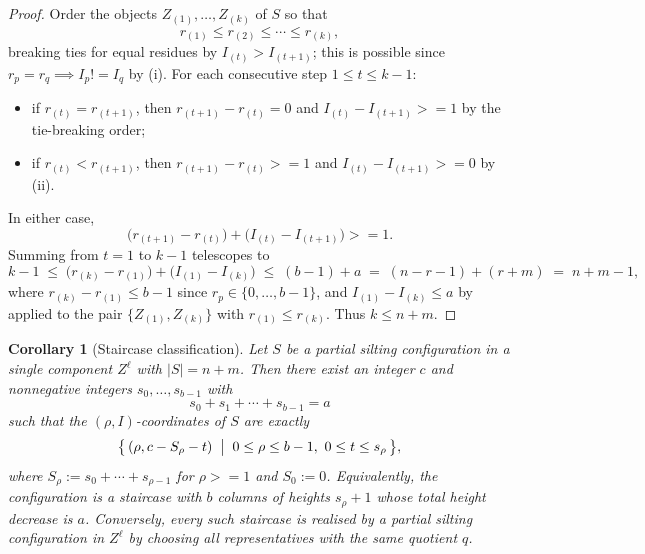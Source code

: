 \documentclass[11pt, a4paper]{article}
\newtheorem{corollary}[theorem]{Corollary}
\theoremstyle{definition}
\def\ge{>=}%
\def\neq{!=}%
\def\mathcal#1{#1}%
\begin{document}
\begin{proof}
Order the objects $Z_{(1)}, \ldots, Z_{(k)}$ of $S$ so that
\[
  r_{(1)} \le r_{(2)} \le \cdots \le r_{(k)},
\]
breaking ties for equal residues by $I_{(t)} > I_{(t+1)}$; this is possible since $r_p = r_q \implies I_p \neq I_q$ by (i). For each consecutive step $1 \le t \le k-1$:
\begin{itemize}
  \item if $r_{(t)} = r_{(t+1)}$, then $r_{(t+1)} - r_{(t)} = 0$ and $I_{(t)} - I_{(t+1)} \ge 1$ by the tie-breaking order;
  \item if $r_{(t)} < r_{(t+1)}$, then $r_{(t+1)} - r_{(t)} \ge 1$ and $I_{(t)} - I_{(t+1)} \ge 0$ by (ii).
\end{itemize}
In either case,
\[
  \bigl(r_{(t+1)} - r_{(t)}\bigr) + \bigl(I_{(t)} - I_{(t+1)}\bigr) \ge 1.
\]
Summing from $t = 1$ to $k - 1$ telescopes to
\[
  k - 1
  \;\le\;
  \bigl(r_{(k)} - r_{(1)}\bigr) + \bigl(I_{(1)} - I_{(k)}\bigr)
  \;\le\;
  (b - 1) + a
  \;=\;
  (n - r - 1) + (r + m)
  \;=\;
  n + m - 1,
\]
where $r_{(k)} - r_{(1)} \le b - 1$ since $r_p \in \{0, \ldots, b-1\}$, and $I_{(1)} - I_{(k)} \le a$ by  applied to the pair $\{Z_{(1)}, Z_{(k)}\}$ with $r_{(1)} \le r_{(k)}$. Thus $k \le n + m$.
\end{proof}

\begin{corollary}[Staircase classification]\label{cor:staircase-classification}
Let $S$ be a partial silting configuration in a single component $\mathcal Z^\ell$ with $|S| = n+m$. Then there exist an integer $c$ and nonnegative integers $s_0, \ldots, s_{b-1}$ with
\[
s_0 + s_1 + \cdots + s_{b-1} = a
\]
such that the $(\rho, I)$-coordinates of $S$ are exactly
\[
\bigl\{\, (\rho, c - S_\rho - t) \;\bigm|\; 0 \le \rho \le b-1,\ 0 \le t \le s_\rho \,\bigr\},
\]
where $S_\rho := s_0 + \cdots + s_{\rho-1}$ for $\rho \ge 1$ and $S_0 := 0$. Equivalently, the configuration is a staircase with $b$ columns of heights $s_\rho+1$ whose total height decrease is $a$. Conversely, every such staircase is realised by a partial silting configuration in $\mathcal Z^\ell$ by choosing all representatives with the same quotient $q$.
\end{corollary}
\end{document}
